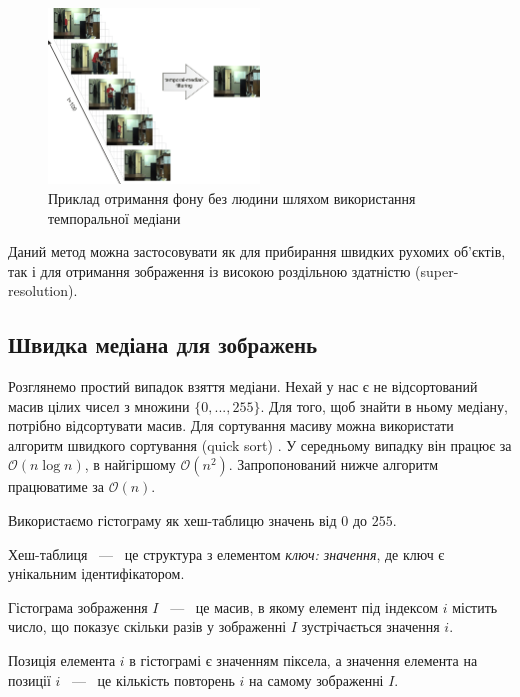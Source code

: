 \begin{figure}[H]
    \centering
    \includegraphics[width=0.5\textwidth]{images/temporal_median_example_1}
    \caption{Приклад отримання фону без людини шляхом використання темпоральної медіани
        \cite{bib:temporal_median_example}
        \label{fig:temporal_median_example}
    }
\end{figure}
Даний метод можна застосовувати як для прибирання швидких рухомих об'єктів,
так і для отримання зображення із високою роздільною здатністю (super-resolution).

\subsection{Швидка медіана для зображень}

Розглянемо простий випадок взяття медіани.
Нехай у нас є не відсортований масив цілих чисел з множини $\{0,..., 255\}$.
Для того, щоб знайти в ньому медіану, потрібно відсортувати масив.
Для сортування масиву можна використати алгоритм швидкого сортування (quick sort)
\cite{bib:quick_sort}. У середньому випадку він працює за $\mathcal{O}(n\log{}n)$, в
найгіршому $\mathcal{O}(n^2)$.
Запропонований нижче алгоритм працюватиме за $\mathcal{O}(n)$.

Використаємо гістограму як хеш-таблицю  значень від $0$ до $255$.
\begin{definition}
    Хеш-таблиця ~---~ це структура з елементом \textit{{ключ: значення}}, де
    ключ є унікальним ідентифікатором.
\end{definition}

\begin{definition}
    Гістограма зображення $I$ ~---~ це масив, в якому елемент під індексом $i$ містить число, що показує скільки
    разів у зображенні $I$ зустрічається значення $i$.
\end{definition}

Позиція елемента $i$ в гістограмі є значенням піксела, а значення елемента на позиції $i$ ~---~ це
кількість повторень $i$ на самому зображенні $I$.

